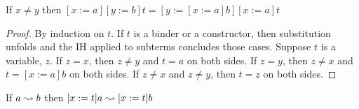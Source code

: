 \begin{lemma}
    If $x \neq y$ then $[x := a][y := b]t = [y := [x := a]b][x := a]t$
    \label{lem:2:subst_commute}
\end{lemma}
\begin{proof}
    By induction on $t$.
    If $t$ is a binder or a constructor, then substitution unfolds and the IH applied to subterms concludes those cases.
    Suppose $t$ is a variable, $z$.
    If $z = x$, then $z \neq y$ and $t = a$ on both sides.
    If $z = y$, then $z \neq x$ and $t = [x := a]b$ on both sides.
    If $z \neq x$ and $z \neq y$, then $t = z$ on both sides.
\end{proof}

\begin{lemma}
    If $a \leadsto b$ then $[x := t]a \leadsto [x := t]b$
    \label{lem:2:betared_subst}
\end{lemma}
